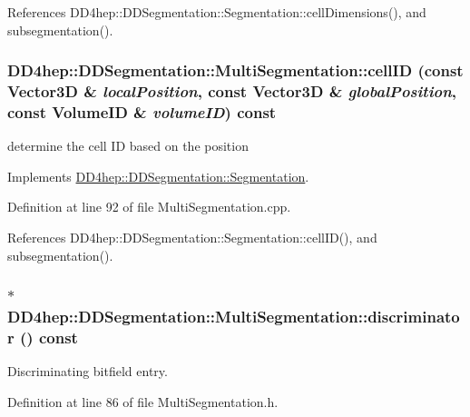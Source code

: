 References DD4hep::DDSegmentation::Segmentation::cellDimensions(), and subsegmentation().\hypertarget{class_d_d4hep_1_1_d_d_segmentation_1_1_multi_segmentation_aefbdc896e43100b7781e07dafc9a9fec}{
\subsubsection[{cellID}]{ DD4hep::DDSegmentation::MultiSegmentation::cellID (const {\bf Vector3D} \& {\em localPosition}, \/  const {\bf Vector3D} \& {\em globalPosition}, \/  const {\bf VolumeID} \& {\em volumeID}) const}}
\label{class_d_d4hep_1_1_d_d_segmentation_1_1_multi_segmentation_aefbdc896e43100b7781e07dafc9a9fec}


determine the cell ID based on the position 

Implements \hyperlink{class_d_d4hep_1_1_d_d_segmentation_1_1_segmentation_ad5a60953d96d409850d8192f64f8ce3c}{DD4hep::DDSegmentation::Segmentation}.

Definition at line 92 of file MultiSegmentation.cpp.

References DD4hep::DDSegmentation::Segmentation::cellID(), and subsegmentation().\hypertarget{class_d_d4hep_1_1_d_d_segmentation_1_1_multi_segmentation_a4dbbd970a59a21ac2da3b83ab2782d95}{
\subsubsection[{discriminator}]{$\ast$ DD4hep::DDSegmentation::MultiSegmentation::discriminator () const}}
\label{class_d_d4hep_1_1_d_d_segmentation_1_1_multi_segmentation_a4dbbd970a59a21ac2da3b83ab2782d95}


Discriminating bitfield entry. 

Definition at line 86 of file MultiSegmentation.h.

